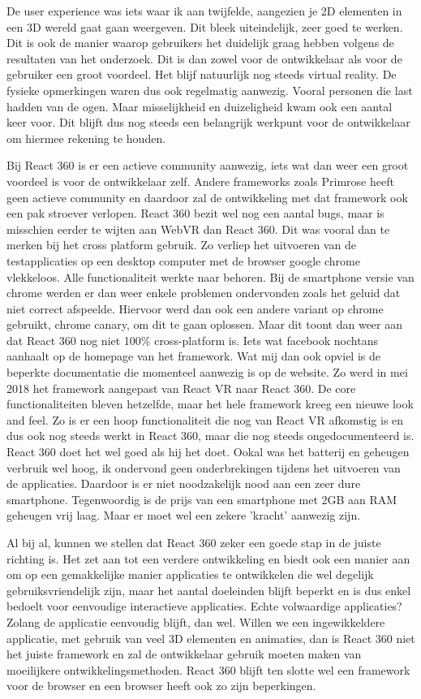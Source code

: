 De user experience was iets waar ik aan twijfelde, aangezien je 2D elementen in een 3D wereld gaat gaan weergeven. Dit bleek uiteindelijk, zeer goed te werken. Dit is ook de manier waarop gebruikers het duidelijk graag hebben volgens de resultaten van het onderzoek. Dit is dan zowel voor de ontwikkelaar als voor de gebruiker een groot voordeel. Het blijf natuurlijk nog steeds virtual reality. De fysieke opmerkingen waren dus ook regelmatig aanwezig. Vooral personen die last hadden van de ogen. Maar misselijkheid en duizeligheid kwam ook een aantal keer voor. Dit blijft dus nog steeds een belangrijk werkpunt voor de ontwikkelaar om hiermee rekening te houden.

Bij React 360 is er een actieve community aanwezig, iets wat dan weer een groot voordeel is voor de ontwikkelaar zelf. Andere frameworks zoals Primrose heeft geen actieve community en daardoor zal de ontwikkeling met dat framework ook een pak stroever verlopen. React 360 bezit wel nog een  aantal bugs, maar is misschien eerder te wijten aan WebVR dan React 360. Dit was vooral dan te merken bij het cross platform gebruik. Zo verliep het uitvoeren van de testapplicaties op een desktop computer met de browser google chrome vlekkeloos. Alle functionaliteit werkte naar behoren. Bij de smartphone versie van chrome werden er dan weer enkele problemen ondervonden zoals het geluid dat niet correct afspeelde. Hiervoor werd dan ook een andere variant op chrome gebruikt, chrome canary, om dit te gaan oplossen. Maar dit toont dan weer aan dat React 360 nog niet 100\% cross-platform is. Iets wat facebook nochtans aanhaalt op de homepage van het framework. Wat mij dan ook opviel is de beperkte documentatie die momenteel aanwezig is op de website. Zo werd in mei 2018 het framework aangepast van React VR naar React 360. De core functionaliteiten bleven hetzelfde, maar het hele framework kreeg een nieuwe look and feel. Zo is er een hoop functionaliteit die nog van React VR afkomstig is en dus ook nog steeds werkt in React 360, maar die nog steeds ongedocumenteerd is. React 360 doet het wel goed als hij het doet. Ookal was het batterij en geheugen verbruik wel hoog, ik ondervond geen onderbrekingen tijdens het uitvoeren van de applicaties. Daardoor is er niet noodzakelijk nood aan een zeer dure smartphone. Tegenwoordig is de prijs van een smartphone met 2GB aan RAM geheugen vrij laag. Maar er moet wel een zekere 'kracht' aanwezig zijn.

Al bij al, kunnen we stellen dat React 360 zeker een goede stap in de juiste richting is. Het zet aan tot een verdere ontwikkeling en biedt ook een manier aan om op een gemakkelijke manier applicaties te ontwikkelen die wel degelijk gebruiksvriendelijk zijn, maar het aantal doeleinden blijft beperkt en is dus enkel bedoelt voor eenvoudige interactieve applicaties. Echte volwaardige applicaties? Zolang de applicatie eenvoudig blijft, dan wel. Willen we een ingewikkeldere applicatie, met gebruik van veel 3D elementen en animaties, dan is React 360 niet het juiste framework en zal de ontwikkelaar gebruik moeten maken van moeilijkere ontwikkelingsmethoden. React 360 blijft ten slotte wel een framework voor de browser en een browser heeft ook zo zijn beperkingen.